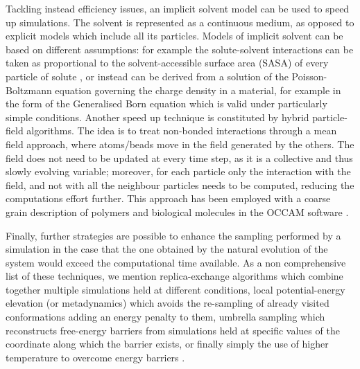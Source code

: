 Tackling instead efficiency issues, an implicit solvent model can be used to speed up simulations. The solvent is represented as a continuous medium, as opposed to explicit models which include all its particles.
%
Models of implicit solvent can be based on different assumptions: for example the solute-solvent interactions can be taken as proportional to the solvent-accessible surface area (SASA) of every particle of solute \cite{Fraternali1996}, or instead can be derived from a solution of the Poisson-Boltzmann equation governing the charge density in a material, for example in the form of the Generalised Born equation \cite{Zhu2005} which is valid under particularly simple conditions.
%
Another speed up technique is constituted by hybrid particle-field algorithms. The idea is to treat non-bonded interactions through a mean field approach, where atoms/beads move in the field generated by the others. The field does not need to be updated at every time step, as it is a collective and thus slowly evolving variable; moreover, for each particle only the interaction with the field, and not with all the neighbour particles needs to be computed, reducing the computations effort further. This approach has been employed with a coarse grain description of polymers and biological molecules in the OCCAM software \cite{Milano2009}.

Finally, further strategies are possible to enhance the sampling performed by a simulation in the case that the one obtained by the natural evolution of the system would exceed the computational time available. As a non comprehensive list of these techniques, we mention replica-exchange algorithms \cite{Okamoto2004} which combine together multiple simulations held at different conditions, local potential-energy elevation (or metadynamics) \cite{Huber1994,Laio2002} which avoids the re-sampling of already visited conformations adding an energy penalty to them, umbrella sampling \cite{Torrie1977} which reconstructs free-energy barriers from simulations held at specific values of the coordinate along which the barrier exists, or finally simply the use of higher temperature to overcome energy barriers \cite{Kirkpatrick1983}.


